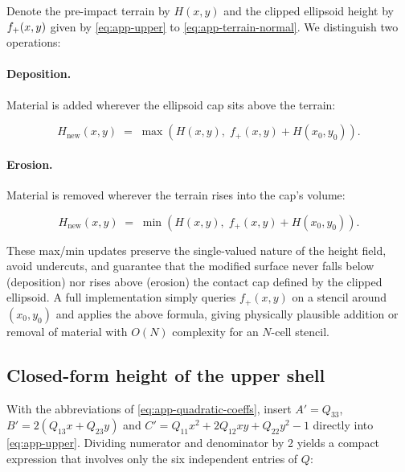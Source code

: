 Denote the pre-impact terrain by $H(x,y)$ and the clipped ellipsoid height by $f_{\smash{+}}(x,y)$ given by \cref{eq:app-upper} to \cref{eq:app-terrain-normal}.  We distinguish two operations:

\paragraph{Deposition.} 
Material is added wherever the ellipsoid cap sits above the terrain:

\begin{equation} 
    H_{\text{new}}(x,y) \;=\;
    \max\left( H(x,y),\; f_{+}(x,y)+H(x_0,y_0) \right).
\end{equation}

\paragraph{Erosion.} 
Material is removed wherever the terrain rises into the cap's volume:

\begin{equation} 
    H_{\text{new}}(x,y) \;=\;
    \min\left( H(x,y),\; f_{+}(x,y)+H(x_0,y_0) \right).
\end{equation}

These max/min updates preserve the single-valued nature of the height field, avoid undercuts, and guarantee that the modified surface never falls below (deposition) nor rises above (erosion) the contact cap defined by the clipped ellipsoid. A full implementation simply queries $f_{+}(x,y)$ on a stencil around
$(x_0,y_0)$ and applies the above formula, giving physically plausible addition or removal of material with $O(N)$ complexity for an $N$-cell stencil.






\subsection*{Closed-form height of the upper shell}

With the abbreviations of \cref{eq:app-quadratic-coeffs}, insert $A'=Q_{33}$, $B'=2(Q_{13}x+Q_{23}y)$ and $C'=Q_{11}x^{2}+2Q_{12}xy+Q_{22}y^{2}-1$ directly into \cref{eq:app-upper}.  Dividing numerator and denominator by 2 yields a compact expression that involves only the six independent entries of $Q$:

